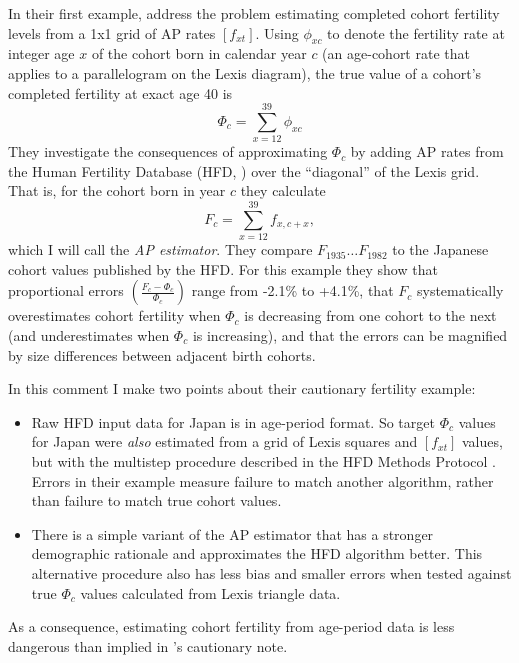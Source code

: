 \documentclass[12pt,letterpaper]{article}
\begin{document}
In their first example, \cite{van_raalte_dangers_2023} address the problem estimating completed
cohort fertility levels from a 1x1 grid of AP rates $[f_{xt}]$. 
Using $\phi_{xc}$ to denote the fertility rate at integer age $x$ of the cohort
born in calendar year $c$  (an age-cohort rate
that applies to a parallelogram on the Lexis diagram), the true value
of a cohort's completed fertility at exact age 40 is 
\begin{equation}
\Phi_{c}=\sum_{x=12}^{39}\phi_{xc}\label{eq:Phi-defn}
\end{equation}
They investigate the consequences of approximating $\Phi_{c}$ by adding AP
rates from the Human Fertility Database (HFD, \citeyear{HFD2023}) over the ``diagonal'' of the Lexis grid. That is, for the cohort
born in year $c$ they calculate
\begin{equation}
F_{c}=\sum_{x=12}^{39}f_{x,c+x},\label{eq:Fc-defn}
\end{equation}
which I will call the \textit{AP
estimator}. They compare $F_{1935}\ldots F_{1982}$ to the Japanese cohort values published by the HFD. For
this example they show that proportional errors $\left(\tfrac{F_{c}-\Phi_{c}}{\Phi_{c}}\right)$
range from -2.1\% to +4.1\%, that $F_c$ systematically overestimates cohort fertility when $\Phi_{c}$ is decreasing from one cohort to the next (and underestimates when $\Phi_c$ is increasing), and that the errors
can be magnified by size differences between adjacent birth cohorts. 

In this comment I make two points about their cautionary fertility example:
\begin{itemize}
\item Raw HFD input data for Japan is in age-period format. So target
$\Phi_{c}$ values for Japan were \emph{also} estimated from a grid of Lexis
squares and $[f_{xt}]$ values, but with the multistep procedure described in the HFD Methods Protocol \citeyearpar{HFD2023}. Errors in their example measure
failure to match another algorithm, rather than failure to match true
cohort values.
\item There is a simple variant of  the AP estimator that has a stronger
demographic rationale and approximates the HFD algorithm better. This alternative procedure also has less bias  and smaller errors when tested against true 
$\Phi_{c}$ values calculated from Lexis triangle data.

\end{itemize}

As a consequence, estimating cohort fertility from age-period data
is less dangerous than implied in \cite{van_raalte_dangers_2023}'s cautionary note. 
\end{document}
